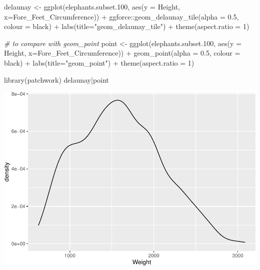 \documentclass[
]{book}
\newenvironment{Shaded}{\begin{snugshade}}{\end{snugshade}}
\newcommand{\AttributeTok}[1]{\textcolor[rgb]{0.77,0.63,0.00}{#1}}
\newcommand{\CommentTok}[1]{\textcolor[rgb]{0.56,0.35,0.01}{\textit{#1}}}
\newcommand{\DecValTok}[1]{\textcolor[rgb]{0.00,0.00,0.81}{#1}}
\newcommand{\FloatTok}[1]{\textcolor[rgb]{0.00,0.00,0.81}{#1}}
\newcommand{\FunctionTok}[1]{\textcolor[rgb]{0.00,0.00,0.00}{#1}}
\newcommand{\NormalTok}[1]{#1}
\newcommand{\OtherTok}[1]{\textcolor[rgb]{0.56,0.35,0.01}{#1}}
\newcommand{\SpecialCharTok}[1]{\textcolor[rgb]{0.00,0.00,0.00}{#1}}
\newcommand{\StringTok}[1]{\textcolor[rgb]{0.31,0.60,0.02}{#1}}
\begin{document}
\begin{Shaded}
\begin{Highlighting}[]
\NormalTok{delaunay }\OtherTok{\textless{}{-}} \FunctionTok{ggplot}\NormalTok{(elephants.subset}\FloatTok{.100}\NormalTok{, }\FunctionTok{aes}\NormalTok{(}\AttributeTok{y =}\NormalTok{ Height, }\AttributeTok{x=}\NormalTok{Fore\_Feet\_Circumference)) }\SpecialCharTok{+}
\NormalTok{  ggforce}\SpecialCharTok{::}\FunctionTok{geom\_delaunay\_tile}\NormalTok{(}\AttributeTok{alpha =} \FloatTok{0.5}\NormalTok{, }\AttributeTok{colour =} \StringTok{\textquotesingle{}black\textquotesingle{}}\NormalTok{) }\SpecialCharTok{+} \FunctionTok{labs}\NormalTok{(}\AttributeTok{title=}\StringTok{"geom\_delaunay\_tile"}\NormalTok{) }\SpecialCharTok{+} \FunctionTok{theme}\NormalTok{(}\AttributeTok{aspect.ratio =} \DecValTok{1}\NormalTok{)}

\CommentTok{\# to compare with geom\_point}
\NormalTok{point }\OtherTok{\textless{}{-}} \FunctionTok{ggplot}\NormalTok{(elephants.subset}\FloatTok{.100}\NormalTok{, }\FunctionTok{aes}\NormalTok{(}\AttributeTok{y =}\NormalTok{ Height, }\AttributeTok{x=}\NormalTok{Fore\_Feet\_Circumference)) }\SpecialCharTok{+}
  \FunctionTok{geom\_point}\NormalTok{(}\AttributeTok{alpha =} \FloatTok{0.5}\NormalTok{, }\AttributeTok{colour =} \StringTok{\textquotesingle{}black\textquotesingle{}}\NormalTok{) }\SpecialCharTok{+} \FunctionTok{labs}\NormalTok{(}\AttributeTok{title=}\StringTok{"geom\_point"}\NormalTok{) }\SpecialCharTok{+} \FunctionTok{theme}\NormalTok{(}\AttributeTok{aspect.ratio =} \DecValTok{1}\NormalTok{)}

\FunctionTok{library}\NormalTok{(patchwork)}
\NormalTok{delaunay}\SpecialCharTok{|}\NormalTok{point}
\end{Highlighting}
\end{Shaded}

\includegraphics{Data-Visualisation-geom-Encyclopedia_files/figure-latex/unnamed-chunk-31-1.pdf}
\end{document}
